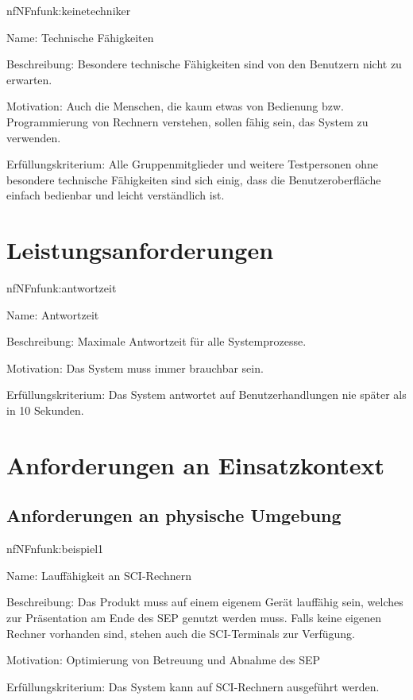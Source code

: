 \begin{description}[leftmargin=5em, style=sameline]	
	\begin{lhp}{nf}{NF}{nfunk:keinetechniker}
		\item [Name:] Technische Fähigkeiten
		\item [Beschreibung:] Besondere technische Fähigkeiten sind von den Benutzern nicht zu erwarten.
		\item [Motivation:] Auch die Menschen, die kaum etwas von Bedienung bzw. Programmierung von Rechnern verstehen, sollen fähig sein, das System zu verwenden.
		\item [Erfüllungskriterium:]
		{Alle Gruppenmitglieder und weitere Testpersonen ohne besondere technische Fähigkeiten sind sich einig, dass die Benutzeroberfläche einfach bedienbar und leicht verständlich ist.}
	\end{lhp}
\end{description}

\section{Leistungsanforderungen}

\begin{description}[leftmargin=5em, style=sameline]	
	\begin{lhp}{nf}{NF}{nfunk:antwortzeit}
		\item [Name:] Antwortzeit
		\item [Beschreibung:] Maximale Antwortzeit für alle Systemprozesse.
		\item [Motivation:] Das System muss immer brauchbar sein.
		\item [Erfüllungskriterium:] Das System antwortet auf Benutzerhandlungen nie später als in 10 Sekunden.
	\end{lhp}
\end{description}

\section{Anforderungen an Einsatzkontext}

\subsection{Anforderungen an physische Umgebung}

\begin{description}[leftmargin=5em, style=sameline]	
	\begin{lhp}{nf}{NF}{nfunk:beispiel1}
		\item [Name:] Lauffähigkeit an SCI-Rechnern
		\item [Beschreibung:] Das Produkt muss auf einem eigenem Gerät lauffähig sein, welches zur Präsentation am Ende des SEP genutzt werden muss. Falls keine eigenen Rechner vorhanden sind, stehen auch die SCI-Terminals zur Verfügung.
		\item [Motivation:] Optimierung von Betreuung und Abnahme des SEP
		\item [Erfüllungskriterium:] {Das System kann auf SCI-Rechnern ausgeführt werden}.
	\end{lhp}
\end{description}


